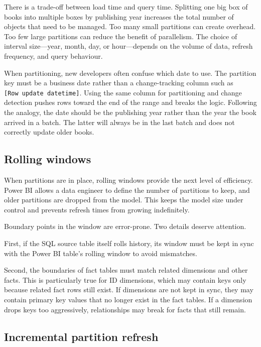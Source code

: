\documentclass[10pt,openany,10pt]{book}
\begin{document}
There is a trade-off between load time and query time. Splitting one big
box of books into multiple boxes by publishing year increases the total
number of objects that need to be managed. Too many small partitions can
create overhead. Too few large partitions can reduce the benefit of
parallelism. The choice of interval size---year, month, day, or
hour---depends on the volume of data, refresh frequency, and query
behaviour.

When partitioning, new developers often confuse which date to use. The
partition key must be a business date rather than a change-tracking
column such as \texttt{{[}Row\ update\ datetime{]}}. Using the same
column for partitioning and change detection pushes rows toward the end
of the range and breaks the logic. Following the analogy, the date
should be the publishing year rather than the year the book arrived in a
batch. The latter will always be in the last batch and does not
correctly update older books.

\subsection{Rolling windows}\label{rolling-windows}

When partitions are in place, rolling windows provide the next level of
efficiency. Power BI allows a data engineer to define the number of
partitions to keep, and older partitions are dropped from the model.
This keeps the model size under control and prevents refresh times from
growing indefinitely.

Boundary points in the window are error-prone. Two details deserve
attention.

First, if the SQL source table itself rolls history, its window must be
kept in sync with the Power BI table's rolling window to avoid
mismatches.

Second, the boundaries of fact tables must match related dimensions and
other facts. This is particularly true for ID dimensions, which may
contain keys only because related fact rows still exist. If dimensions
are not kept in sync, they may contain primary key values that no longer
exist in the fact tables. If a dimension drops keys too aggressively,
relationships may break for facts that still remain.

\subsection{Incremental partition
refresh}\label{incremental-partition-refresh}
\end{document}
